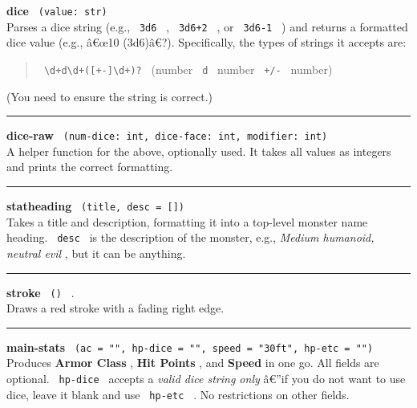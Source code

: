 \textbf{dice} \texttt{\ (value:\ str)\ }\\
Parses a dice string (e.g., \texttt{\ 3d6\ } , \texttt{\ 3d6+2\ } , or
\texttt{\ 3d6-1\ } ) and returns a formatted dice value (e.g., â€œ10
(3d6)â€?). Specifically, the types of strings it accepts are:

\begin{quote}
\texttt{\ \textbackslash{}d+d\textbackslash{}d+({[}+-{]}\textbackslash{}d+)?\ }
(number \texttt{\ d\ } number \texttt{\ +/-\ } number)
\end{quote}

(You need to ensure the string is correct.)

\begin{center}\rule{0.5\linewidth}{0.5pt}\end{center}

\textbf{dice-raw}
\texttt{\ (num-dice:\ int,\ dice-face:\ int,\ modifier:\ int)\ }\\
A helper function for the above, optionally used. It takes all values as
integers and prints the correct formatting.

\begin{center}\rule{0.5\linewidth}{0.5pt}\end{center}

\textbf{statheading} \texttt{\ (title,\ desc\ =\ {[}{]})\ }\\
Takes a title and description, formatting it into a top-level monster
name heading. \texttt{\ desc\ } is the description of the monster, e.g.,
\emph{Medium humanoid, neutral evil} , but it can be anything.

\begin{center}\rule{0.5\linewidth}{0.5pt}\end{center}

\textbf{stroke} \texttt{\ ()\ } .\\
Draws a red stroke with a fading right edge.

\begin{center}\rule{0.5\linewidth}{0.5pt}\end{center}

\textbf{main-stats}
\texttt{\ (ac\ =\ "",\ hp-dice\ =\ "",\ speed\ =\ "30ft",\ hp-etc\ =\ "")\ }\\
Produces \textbf{Armor Class} , \textbf{Hit Points} , and \textbf{Speed}
in one go. All fields are optional. \texttt{\ hp-dice\ } accepts a
\emph{valid dice string only} â€''if you do not want to use dice, leave
it blank and use \texttt{\ hp-etc\ } . No restrictions on other fields.

